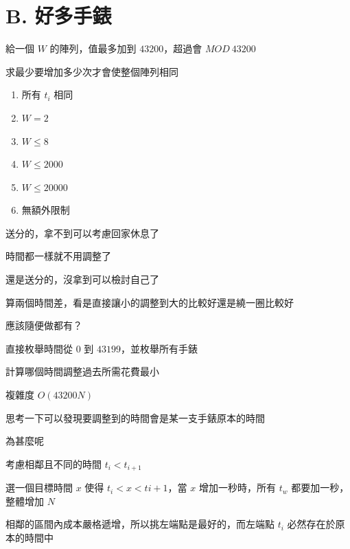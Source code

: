 \section{B. 好多手錶}

\begin{frame}{}
    給一個 $W$ 的陣列，值最多加到 $43200$，超過會 $MOD\ 43200$

    求最少要增加多少次才會使整個陣列相同
\end{frame}

\begin{frame}{}
    \begin{enumerate}
        \item{所有 $t_i$ 相同}
        \item{$W = 2$}
        \item{$W \le 8$}
        \item{$W \le 2000$}
        \item{$W \le 20000$}
        \item{無額外限制}
    \end{enumerate}
\end{frame}

\begin{frame}{}
    送分的，拿不到可以考慮回家休息了

    時間都一樣就不用調整了
\end{frame}

\begin{frame}{}
    還是送分的，沒拿到可以檢討自己了

    算兩個時間差，看是直接讓小的調整到大的比較好還是繞一圈比較好
\end{frame}

\begin{frame}{}
    應該隨便做都有？
\end{frame}

\begin{frame}{}
    直接枚舉時間從 $0$ 到 $43199$，並枚舉所有手錶

    計算哪個時間調整過去所需花費最小

    複雜度 $O(43200N)$
\end{frame}

\begin{frame}{}
    思考一下可以發現要調整到的時間會是某一支手錶原本的時間

    為甚麼呢

    考慮相鄰且不同的時間 $t_i < t_{i + 1}$

    選一個目標時間 $x$ 使得 $t_i < x < t{i + 1}$，當 $x$ 增加一秒時，所有 $t_w$ 都要加一秒，整體增加 $N$

    相鄰的區間內成本嚴格遞增，所以挑左端點是最好的，而左端點 $t_i$ 必然存在於原本的時間中
\end{frame}

